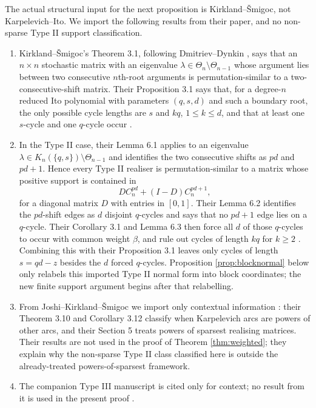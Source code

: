 \documentclass[11pt]{article}
\theoremstyle{definition}
\theoremstyle{remark}
\begin{document}
The actual structural input for the next proposition is Kirkland--\v Smigoc, not Karpelevich--Ito.  We import the following results from their paper, and no non-sparse Type II support classification.
\begin{enumerate}[label=\textup{(I\arabic*)},leftmargin=*]
\item Kirkland--\v Smigoc's Theorem 3.1, following Dmitriev--Dynkin
\cite{DmitrievDynkin1946}, says that an $n\times n$ stochastic matrix with an
eigenvalue $\lambda\in\Theta_n\setminus\Theta_{n-1}$ whose argument lies
between two consecutive $n$th-root arguments is permutation-similar to a
two-consecutive-shift matrix.  Their Proposition 3.1 says that, for a
degree-$n$ reduced Ito polynomial with parameters $(q,s,d)$ and such a
boundary root, the only possible cycle lengths are $s$ and $kq$,
$1\le k\le d$, and that at least one $s$-cycle and one $q$-cycle occur
\cite[Theorem 3.1 and Proposition 3.1]{KirklandSmigoc2022}.

\item In the Type II case, their Lemma 6.1 applies to an eigenvalue
$\lambda\in K_n(\{q,s\})\setminus\Theta_{n-1}$ and identifies the two
consecutive shifts as $pd$ and $pd+1$.  Hence every Type II realiser is
permutation-similar to a matrix whose positive support is contained in
\begin{equation}
        D C_n^{pd}+(I-D)C_n^{pd+1},
        \label{eq:KSnormal}
\end{equation}
for a diagonal matrix $D$ with entries in $[0,1]$.  Their Lemma 6.2
identifies the $pd$-shift edges as $d$ disjoint $q$-cycles and says that
no $pd+1$ edge lies on a $q$-cycle.  Their Corollary 3.1 and Lemma 6.3
then force all $d$ of those $q$-cycles to occur with common weight
$\beta$, and rule out cycles of length $kq$ for $k\ge2$
\cite[Corollary 3.1 and Lemmas 6.1--6.3]{KirklandSmigoc2022}.  Combining
this with their Proposition 3.1 leaves only cycles of length
$s=qd-z$ besides the $d$ forced $q$-cycles.  Proposition
\ref{prop:blocknormal} below only relabels this imported Type II normal
form into block coordinates; the new finite support argument begins after
that relabelling.

\item From Joshi--Kirkland--\v Smigoc we import only contextual information \cite[Theorem 3.10, Corollary 3.12, and Section 5]{JoshiKirklandSmigoc2023}: their Theorem 3.10 and Corollary 3.12 classify when Karpelevich arcs are powers of other arcs, and their Section 5 treats powers of sparsest realising matrices.  Their results are not used in the proof of Theorem \ref{thm:weighted}; they explain why the non-sparse Type II class classified here is outside the already-treated powers-of-sparsest framework.

\item The companion Type III manuscript is cited only for context; no result from it is used in the present proof \cite{VerbekenGinisTypeIII}.
\end{enumerate}
\end{document}
